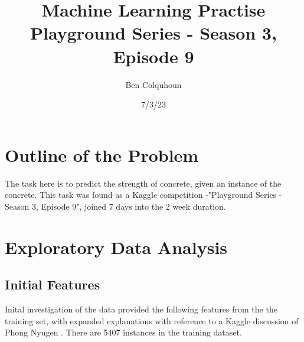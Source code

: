 \documentclass[onecolumn, 11pt]{article}
\title{Machine Learning Practise\\Playground Series - Season 3, Episode 9}
\author{Ben Colquhoun}
\date{7/3/23}
\begin{document}
\pagestyle{plain}
\maketitle
\section*{Outline of the Problem}
The task here is to predict the strength of concrete, given an instance of the concrete. This task was found as a Kaggle competition -"Playground Series - Season 3, Episode 9", joined 7 days into the 2 week duration. 
\section*{Exploratory Data Analysis}
\subsection*{Initial Features}
Inital investigation of the data provided the following features from the the training set, with expanded explanations with reference to a Kaggle discussion of Phong Nyugen \cite{feature_descriptions}. There are 5407 instances in the training dataset. 
\end{document}
